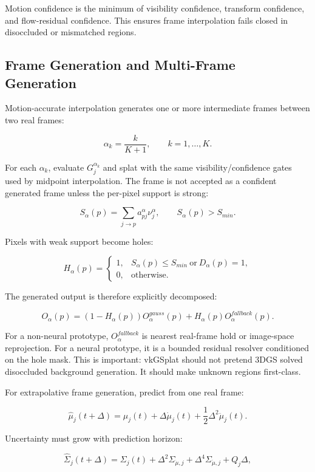 \documentclass[11pt]{article}
\begin{document}
Motion confidence is the minimum of visibility confidence, transform
confidence, and flow-residual confidence. This ensures frame interpolation
fails closed in disoccluded or mismatched regions.

\subsection{Frame Generation and Multi-Frame Generation}

Motion-accurate interpolation generates one or more intermediate frames between
two real frames:

\[
  \alpha_k = \frac{k}{K+1},
  \qquad
  k=1,\ldots,K.
\]

For each $\alpha_k$, evaluate $G_j^{\alpha_k}$ and splat with the same
visibility/confidence gates used by midpoint interpolation. The frame is not
accepted as a confident generated frame unless the per-pixel support is strong:

\[
  S_{\alpha}(p)=\sum_{j\rightarrow p}a_{pj}^{\alpha}\nu_j^{\alpha},
  \qquad
  S_{\alpha}(p) > S_{min}.
\]

Pixels with weak support become holes:

\[
  H_{\alpha}(p)=
  \begin{cases}
  1, & S_{\alpha}(p)\leq S_{min}\ \text{or}\ D_{\alpha}(p)=1,\\
  0, & \text{otherwise}.
  \end{cases}
\]

The generated output is therefore explicitly decomposed:

\[
  O_{\alpha}(p) =
  (1-H_{\alpha}(p))O_{\alpha}^{gauss}(p)
  + H_{\alpha}(p)O_{\alpha}^{fallback}(p).
\]

For a non-neural prototype, $O_{\alpha}^{fallback}$ is nearest real-frame hold
or image-space reprojection. For a neural prototype, it is a bounded residual
resolver conditioned on the hole mask. This is important: vkGSplat should not
pretend 3DGS solved disoccluded background generation. It should make unknown
regions first-class.

For extrapolative frame generation, predict from one real frame:

\[
  \hat{\mu}_j(t+\Delta) =
  \mu_j(t) + \Delta\dot{\mu}_j(t) +
  \frac{1}{2}\Delta^2\ddot{\mu}_j(t).
\]

Uncertainty must grow with prediction horizon:

\[
  \hat{\Sigma}_j(t+\Delta) =
  \Sigma_j(t) + \Delta^2\Sigma_{\dot{\mu},j}
  + \Delta^4\Sigma_{\ddot{\mu},j} + Q_j\Delta,
\]
\end{document}
